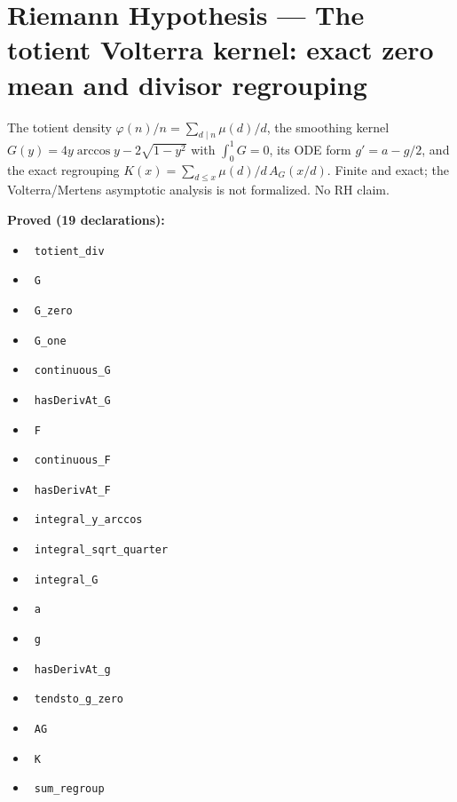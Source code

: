 \documentclass{report}
\theoremstyle{definition}
\begin{document}
\section{Riemann Hypothesis --- The totient Volterra kernel: exact zero mean and divisor regrouping}
The totient density $\varphi(n)/n=\sum_{d\mid n}\mu(d)/d$, the smoothing kernel $G(y)=4y\arccos y-2\sqrt{1-y^2}$ with $\int_0^1G=0$, its ODE form $g'=a-g/2$, and the exact regrouping $K(x)=\sum_{d\le x}\mu(d)/d\,A_G(x/d)$. Finite and exact; the Volterra/Mertens asymptotic analysis is not formalized. No RH claim.

\noindent\textbf{Proved (19 declarations):}
\begin{itemize}
  \item {}\leanok\ \texttt{totient\_div}
  \item {}\leanok\ \texttt{G}
  \item {}\leanok\ \texttt{G\_zero}
  \item {}\leanok\ \texttt{G\_one}
  \item {}\leanok\ \texttt{continuous\_G}
  \item {}\leanok\ \texttt{hasDerivAt\_G}
  \item {}\leanok\ \texttt{F}
  \item {}\leanok\ \texttt{continuous\_F}
  \item {}\leanok\ \texttt{hasDerivAt\_F}
  \item {}\leanok\ \texttt{integral\_y\_arccos}
  \item {}\leanok\ \texttt{integral\_sqrt\_quarter}
  \item {}\leanok\ \texttt{integral\_G}
  \item {}\leanok\ \texttt{a}
  \item {}\leanok\ \texttt{g}
  \item {}\leanok\ \texttt{hasDerivAt\_g}
  \item {}\leanok\ \texttt{tendsto\_g\_zero}
  \item {}\leanok\ \texttt{AG}
  \item {}\leanok\ \texttt{K}
  \item {}\leanok\ \texttt{sum\_regroup}
\end{itemize}
\end{document}
